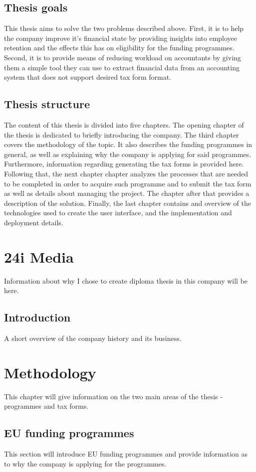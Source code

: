 \documentclass[12pt,oneside]{fithesis2}
\begin{document}
    \section{Thesis goals}
    This thesis aims to solve the two problems described above. First, it is to help the company improve it's financial state by providing insights into employee retention and the effects this has on eligibility for the funding programmes. Second, it is to provide means of reducing workload on accountants by giving them a simple tool they can use to extract financial data from an accounting system that does not support desired tax form format.
    \section{Thesis structure}
    The content of this thesis is divided into five chapters. The opening chapter of the thesis is dedicated to briefly introducing the company. The third chapter covers the methodology of the topic. It also describes the funding programmes in general, as well as explaining why the company is applying for said programmes. Furthermore, information regarding generating the tax forms is provided here. Following that, the next chapter chapter analyzes the processes that are needed to be completed in order to acquire such programme and to submit the tax form as well as details about managing the project. The chapter after that provides a description of the solution. Finally, the last chapter contains and overview of the technologies used to create the user interface, and the implementation and deployment details.
    \chapter{24i Media}
    Information about why I chose to create diploma thesis in this company will be here.
    \section{Introduction}
    A short overview of the company history and its business.
    \chapter{Methodology}
    This chapter will give information on the two main areas of the thesis - programmes and tax forms.
    \section{EU funding programmes}
    This section will introduce EU funding programmes and provide information as to why the company is applying for the programmes.
\end{document}
